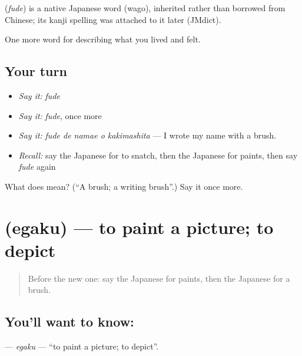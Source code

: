 \begin{cousinweb}
\textbf{} (\emph{fude}) is a native Japanese word (wago), inherited rather than borrowed from Chinese; its kanji spelling was attached to it later (JMdict).
\end{cousinweb}

\begin{grammarlens}[title={What you've built}]
One more word for describing what you lived and felt.
\end{grammarlens}

\subsection*{Your turn}
\begin{itemize}
\raggedright
  \item \emph{Say it:} \emph{fude}
  \item \emph{Say it:} \emph{fude}, once more
  \item \emph{Say it:} \emph{fude de namae o kakimashita} — I wrote my name with a brush.
  \item \emph{Recall:} say the Japanese for to snatch, then the Japanese for paints, then say \emph{fude} again
\end{itemize}

\begin{tcolorbox}[breakable,colback=teal!4,colframe=teal!35!black,title={Before you move on}]
What does  mean? (\textquotedblleft{}A brush; a writing brush\textquotedblright{}.) Say it once more.
\end{tcolorbox}
\section[\texorpdfstring{\ja{えがく} (egaku)}{えがく (egaku)}]{ (egaku) — to paint a picture; to depict}

\label{lesson:JA-C465-egaku}



\begin{quote}
Before the new one: say the Japanese for paints, then the Japanese for a brush.
\end{quote}

\subsection*{You'll want to know: }
\textbf{} — \emph{egaku} — \textquotedblleft{}to paint a picture; to depict\textquotedblright{}.

